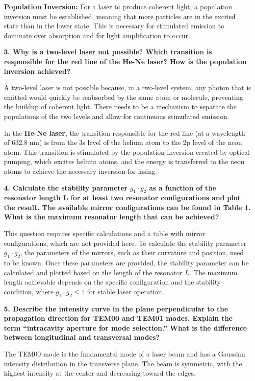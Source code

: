 \documentclass{article}
\begin{document}
\textbf{Population Inversion:} For a laser to produce coherent light, a population inversion must be established, meaning that more particles are in the excited state than in the lower state. This is necessary for stimulated emission to dominate over absorption and for light amplification to occur.

\textbf{3. Why is a two-level laser not possible? Which transition is responsible for the red line of the He-Ne laser? How is the population inversion achieved?}

A two-level laser is not possible because, in a two-level system, any photon that is emitted would quickly be reabsorbed by the same atom or molecule, preventing the buildup of coherent light. There needs to be a mechanism to separate the populations of the two levels and allow for continuous stimulated emission.

In the \textbf{He-Ne laser}, the transition responsible for the red line (at a wavelength of 632.8 nm) is from the 3s level of the helium atom to the 2p level of the neon atom. This transition is stimulated by the population inversion created by optical pumping, which excites helium atoms, and the energy is transferred to the neon atoms to achieve the necessary inversion for lasing.

\textbf{4. Calculate the stability parameter \( g_1 \cdot g_2 \) as a function of the resonator length L for at least two resonator configurations and plot the result. The available mirror configurations can be found in Table 1. What is the maximum resonator length that can be achieved?}

This question requires specific calculations and a table with mirror configurations, which are not provided here. To calculate the stability parameter \( g_1 \cdot g_2 \), the parameters of the mirrors, such as their curvature and position, need to be known. Once these parameters are provided, the stability parameter can be calculated and plotted based on the length of the resonator \( L \). The maximum length achievable depends on the specific configuration and the stability condition, where \( g_1 \cdot g_2 \leq 1 \) for stable laser operation.

\textbf{5. Describe the intensity curve in the plane perpendicular to the propagation direction for TEM00 and TEM01 modes. Explain the term “intracavity aperture for mode selection.” What is the difference between longitudinal and transversal modes?}

The TEM00 mode is the fundamental mode of a laser beam and has a Gaussian intensity distribution in the transverse plane. The beam is symmetric, with the highest intensity at the center and decreasing toward the edges.
\end{document}
